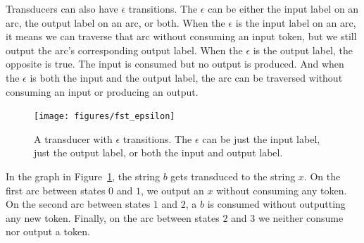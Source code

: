 Transducers can also have $\epsilon$ transitions. The $\epsilon$ can be either
the input label on an arc, the output label on an arc, or both. When the
$\epsilon$ is the input label on an arc, it means we can traverse that arc
without consuming an input token, but we still output the arc's corresponding
output label. When the $\epsilon$ is the output label, the opposite is true.
The input is consumed but no output is produced. And when the $\epsilon$ is
both the input and the output label, the arc can be traversed without consuming
an input or producing an output.

\begin{figure}
    \centering
    \texttt{[image: figures/fst\_epsilon]}
    \caption{A transducer with $\epsilon$ transitions. The $\epsilon$ can be
    just the input label, just the output label, or both the input and output
    label.}
    \label{fig:fst_epsilon}
\end{figure}

In the graph in Figure~\ref{fig:fst_epsilon}, the string $b$ gets transduced to
the string $x$. On the first arc between states $0$ and $1$, we output an $x$
without consuming any token. On the second arc between states $1$ and $2$, a
$b$ is consumed without outputting any new token. Finally, on the arc between
states $2$ and $3$ we neither consume nor output a token.
